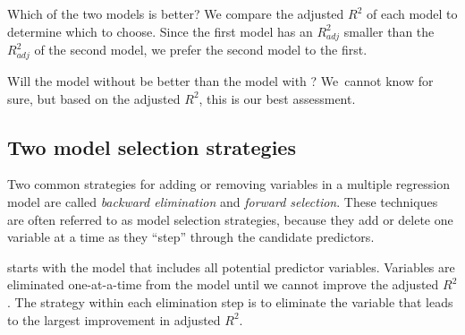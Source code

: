 \begin{examplewrap}
\begin{nexample}{Which of the two models is better?}
We compare the adjusted $R^2$ of each model to determine which to choose. Since the first model has an $R^2_{adj}$ smaller than the $R^2_{adj}$ of the second model, we prefer the second model to the first.
\end{nexample}
\end{examplewrap}

Will the model without  be better than the model with ? We~cannot know for sure, but based on the adjusted $R^2$, this is our best assessment.


\subsection{Two model selection strategies}

Two common strategies for adding or removing variables in a multiple regression model are called \emph{backward elimination} and \emph{forward selection}. These techniques are often referred to as  model selection strategies, because they add or delete one variable at a time as they ``step'' through the candidate predictors.

 starts with the model that includes all potential predictor variables. Variables are eliminated one-at-a-time from the model until we cannot improve the adjusted $R^2$. The strategy within each elimination step is to eliminate the variable that leads to the largest improvement in adjusted $R^2$.


